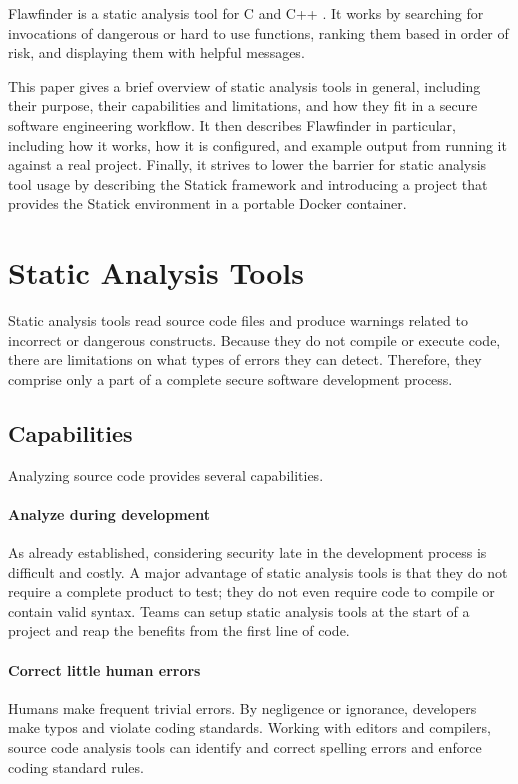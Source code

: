 \documentclass[journal]{IEEEtran}
\begin{document}
Flawfinder is a static analysis tool for C and C++ \cite{flawfinder}. It works by searching for
invocations of dangerous or hard to use functions, ranking them based in order of risk, and
displaying them with helpful messages.

This paper gives a brief overview of static analysis tools in general, including their purpose,
their capabilities and limitations, and how they fit in a secure software engineering workflow. It
then describes Flawfinder in particular, including how it works, how it is configured, and example
output from running it against a real project. Finally, it strives to lower the barrier for static
analysis tool usage by describing the Statick framework and introducing a project that provides the
Statick environment in a portable Docker container.


\section{Static Analysis Tools}

Static analysis tools read source code files and produce warnings related to incorrect or dangerous
constructs. Because they do not compile or execute code, there are limitations on what types of
errors they can detect. Therefore, they comprise only a part of a complete secure software
development process.

\subsection{Capabilities}

Analyzing source code provides several capabilities.

\paragraph{Analyze during development} As already established, considering security late in the
development process is difficult and costly. A major advantage of static analysis tools is that they
do not require a complete product to test; they do not even require code to compile or contain valid
syntax. Teams can setup static analysis tools at the start of a project and reap the benefits from
the first line of code.

\paragraph{Correct little human errors} Humans make frequent trivial errors. By negligence or
ignorance, developers make typos and violate coding standards. Working with editors and compilers,
source code analysis tools can identify and correct spelling errors and enforce coding standard
rules.
\end{document}
